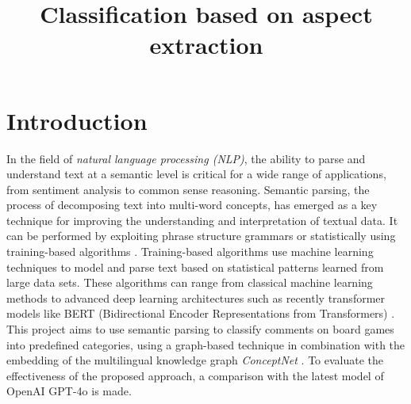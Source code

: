 \documentclass[sn-mathphys-num]{sn-jnl}%
\theoremstyle{thmstyleone}%
\theoremstyle{thmstyletwo}%
\theoremstyle{thmstylethree}%
\begin{document}
\title[Classification based on aspect extractione]{Classification based on aspect extraction}


\author*[1,2]{ }






\maketitle

\section{Introduction}\label{intro}
    In the field of \textit{natural language processing (NLP)}, the ability to parse and understand text at a semantic level is critical for a wide range of applications, from sentiment analysis to common sense reasoning. Semantic parsing, the process of decomposing text into multi-word concepts, has emerged as a key technique for improving the understanding and interpretation of textual data. It can be performed by exploiting phrase structure grammars or statistically using training-based algorithms \cite{10.1145/2487788.2487995}. Training-based algorithms use machine learning techniques to model and parse text based on statistical patterns learned from large data sets. These algorithms can range from classical machine learning methods to advanced deep learning architectures such as recently transformer models like BERT (Bidirectional Encoder Representations from Transformers) \cite{DBLP:journals/corr/abs-1810-04805}.\\
    This project aims to use semantic parsing to classify comments on board games into predefined categories, using a graph-based technique in combination with the embedding of the multilingual knowledge graph \textit{ConceptNet} \cite{DBLP:journals/corr/SpeerCH16}. To evaluate the effectiveness of the proposed approach, a comparison with the latest model of OpenAI GPT-4o is made. 
\end{document}
